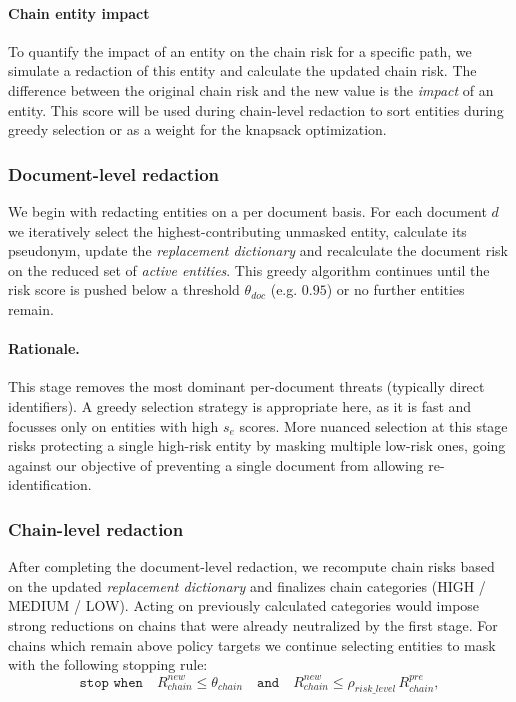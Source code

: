 \paragraph{Chain entity impact}
To quantify the impact of an entity on the chain risk for a specific path, we simulate a redaction of this entity and calculate the updated chain risk. The difference between the original chain risk and the new value is the \textit{impact} of an entity. This score will be used during chain-level redaction to sort entities during greedy selection or as a weight for the knapsack optimization.


\subsubsection{Document-level redaction}
We begin with redacting entities on a per document basis. For each document $d$ we iteratively select the highest-contributing unmasked entity, calculate its pseudonym, update the \textit{replacement dictionary} and recalculate the document risk on the reduced set of \textit{active entities}. This greedy algorithm continues until the risk score is pushed below a threshold $\theta_{doc}$ (e.g. $0.95$) or no further entities remain.
\paragraph{Rationale.} This stage removes the most dominant per-document threats (typically direct identifiers). A greedy selection strategy is appropriate here, as it is fast and focusses only on entities with high $s_e$ scores. More nuanced selection at this stage risks protecting a single high-risk entity by masking multiple low-risk ones, going against our objective of preventing a single document from allowing re-identification.

\subsubsection{Chain-level redaction}
After completing the document-level redaction, we recompute chain risks based on the updated \textit{replacement dictionary} and finalizes chain categories (HIGH / MEDIUM / LOW). Acting on previously calculated categories would impose strong reductions on chains that were already neutralized by the first stage. For chains which remain above policy targets we continue selecting entities to mask with the following stopping rule:
\[
    \texttt{stop when}\quad R_{chain}^{new} \le \theta_{chain} \quad \texttt{and} \quad R_{chain}^{new} \le \rho_{risk\_level}\,R_{chain}^{pre},
\]

